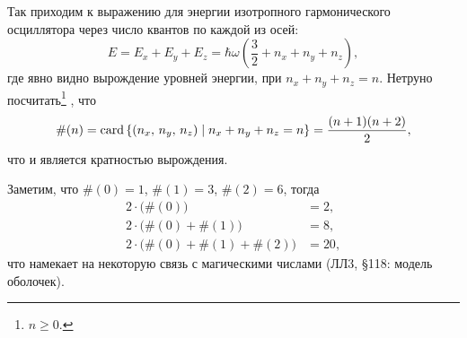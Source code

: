 Так приходим к выражению для энергии изотропного гармонического осциллятора через число квантов по каждой из осей:
\begin{equation*}
    E = E_x + E_y + E_z = \hbar \omega \left(\frac{3}{2}+ n_x + n_y + n_z\right),
\end{equation*}
где явно видно вырождение уровней энергии, при $n_x + n_y + n_z = n$. Нетруно посчитать\footnote{
    $n \geq 0$.
} , что
\begin{equation*}
    \#(n) = \mathop{\mathrm{card}}\nolimits \left\{
        (n_x,\, n_y,\, n_z) \mid 
        n_x + n_y + n_z = n
    \right\}  = \frac{(n+1)(n+2)}{2},
\end{equation*}
что и является кратностью вырождения.

Заметим, что $\#(0) = 1$, $\#(1) = 3$, $\#(2) = 6$, тогда
\begin{align*}
    2 \cdot \big(\#(0)\big) &= 2, \\
    2 \cdot \big(\#(0)+\#(1)\big) &= 8, \\
    2 \cdot \big(\#(0)+\#(1)+\#(2)\big) &= 20,
\end{align*}
что намекает на некоторую связь с магическими числами (ЛЛ3, \S 118: модель оболочек).